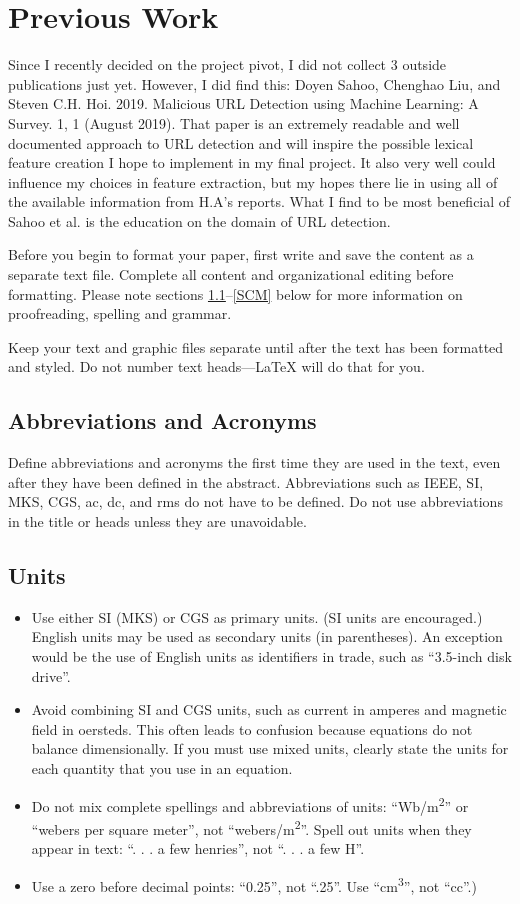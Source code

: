 \documentclass[conference]{IEEEtran}
\begin{document}
\section{Previous Work}
Since I recently decided on the project pivot, I did not collect 3 outside publications just yet. However, I did find this: Doyen Sahoo, Chenghao Liu, and Steven C.H. Hoi. 2019. Malicious URL Detection using Machine Learning: A Survey. 1, 1 (August 2019).  That paper is an extremely readable and well documented approach to URL detection and will inspire the possible lexical feature creation I hope to implement in my final project. It also very well could influence my choices in feature extraction, but my hopes there lie in using all of the available information from H.A’s reports. What I find to be most beneficial of Sahoo et al. is the education on the domain of URL detection.

Before you begin to format your paper, first write and save the content as a 
separate text file. Complete all content and organizational editing before 
formatting. Please note sections \ref{AA}--\ref{SCM} below for more information on 
proofreading, spelling and grammar.

Keep your text and graphic files separate until after the text has been 
formatted and styled. Do not number text heads---{\LaTeX} will do that 
for you.

\subsection{Abbreviations and Acronyms}\label{AA}
Define abbreviations and acronyms the first time they are used in the text, 
even after they have been defined in the abstract. Abbreviations such as 
IEEE, SI, MKS, CGS, ac, dc, and rms do not have to be defined. Do not use 
abbreviations in the title or heads unless they are unavoidable.

\subsection{Units}
\begin{itemize}
\item Use either SI (MKS) or CGS as primary units. (SI units are encouraged.) English units may be used as secondary units (in parentheses). An exception would be the use of English units as identifiers in trade, such as ``3.5-inch disk drive''.
\item Avoid combining SI and CGS units, such as current in amperes and magnetic field in oersteds. This often leads to confusion because equations do not balance dimensionally. If you must use mixed units, clearly state the units for each quantity that you use in an equation.
\item Do not mix complete spellings and abbreviations of units: ``Wb/m\textsuperscript{2}'' or ``webers per square meter'', not ``webers/m\textsuperscript{2}''. Spell out units when they appear in text: ``. . . a few henries'', not ``. . . a few H''.
\item Use a zero before decimal points: ``0.25'', not ``.25''. Use ``cm\textsuperscript{3}'', not ``cc''.)
\end{itemize}
\end{document}

